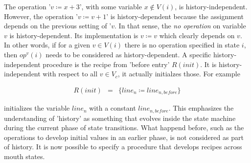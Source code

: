 \documentclass[12pt,a4paper]{scrartcl}
\begin{document}
The operation '$v\coloneqq x+3$', with some variable $x\notin V(i)$, is
history-independent.  However, the operation '$v\coloneqq v+1$' is history-dependent
because the assignment depends on the previous setting of '$v$. In that sense,
the \textit{no operation} on variable $v$ is history-dependent. Its
implementation is $v\coloneqq v$ which clearly depends on $v$. In other words,
if for a given $v\in V(i)$ there is no operation specified in state $i$, then
$op^v(i)$ needs to be considered as history-dependent. A specific history-independent
procedure is the recipe from 'before entry' $R(init)$. It is history-independent with
respect to all $v\in V_c$, it actually initialzes those. For example

\begin{eqnarray}
    R(init) & = & \{ line_n \coloneqq line_{n,before} \}
\end{eqnarray}

initializes the variable $line_n$ with a constant $line_{n,before}$. This
emphasizes the understanding of 'history' as something that evolves inside the
state machine during the current phase of state transitions. What happend
before, such as the operations to develop initial values in an earlier phase,
is not considered as part of history.  It is now possible to specify a
procedure that develops recipes across mouth states. 
\end{document}
